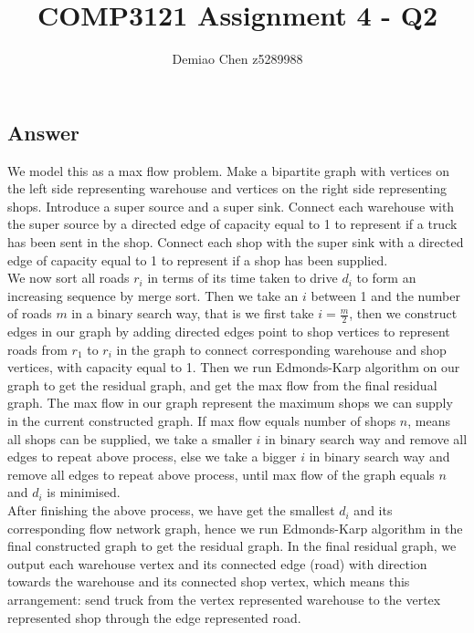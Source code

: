\documentclass[12pt]{article}
\title{COMP3121 Assignment 4 - Q2}
\author{Demiao Chen z5289988}
\begin{document}
\maketitle
{}

\subsection*{Answer}
We model this as a max flow problem. 
Make a bipartite graph with vertices on the left side 
representing warehouse and vertices on the right 
side representing shops. Introduce a super source and a super sink.
Connect each warehouse with the super source by a directed edge 
of capacity equal to 1 to represent if a truck has been sent in the shop. 
Connect each shop with the super sink with a directed edge of 
capacity equal to 1 to represent if a shop has been supplied. \\
We now sort all roads $r_i$ in terms of its time taken to drive $d_i$ to form an 
increasing sequence by merge sort. Then we take an $i$ between 1 and the 
number of roads $m$ in a binary search way, that is we first take
$i = \frac{m}{2}$, then we construct edges in our graph by adding 
directed edges point to shop vertices to represent roads
from $r_1$ to $r_i$ in the graph to connect corresponding 
warehouse and shop vertices, with capacity equal to 1.
Then we run 
Edmonds-Karp algorithm on our graph to get the residual 
graph, and get the max flow from the final residual graph. 
The max flow in our graph represent the maximum shops we can 
supply in the current constructed graph.
If max flow equals number of shops $n$, means all shops can be 
supplied, we take a smaller $i$ in binary search way and remove all edges to repeat
above process, 
else we take a bigger $i$ in binary search way and remove all edges to repeat
above process, 
until max flow of the graph equals $n$ and $d_i$ is minimised.\\
After finishing the above process, we have get the smallest $d_i$ and 
its corresponding flow network graph,
hence we run Edmonds-Karp algorithm in the 
final constructed graph to get the residual 
graph. In the final residual graph, we output 
each warehouse vertex and its connected edge (road) 
with direction towards the warehouse and
its connected shop vertex, which means this arrangement: send truck from the vertex
represented warehouse
to the vertex represented shop through the edge represented road.\\\\
\end{document}
